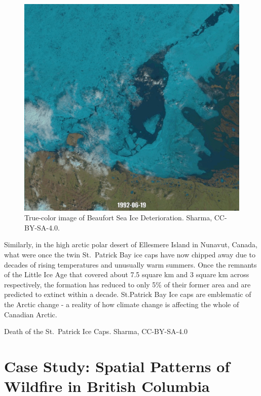 \documentclass[
]{book}
\begin{document}
\begin{figure}
\includegraphics[width=16.57in]{images/13-Beaufort-Sea-Ice-static} \caption{True-color image of Beaufort Sea Ice Deterioration. Sharma, CC-BY-SA-4.0.}\label{fig:14-Beaufort-Sea-Ice}
\end{figure}

Similarly, in the high arctic polar desert of Ellesmere Island in Nunavut, Canada, what were once the twin St.~Patrick Bay ice caps have now chipped away due to decades of rising temperatures and unusually warm summers. Once the remnants of the Little Ice Age that covered about 7.5 square km and 3 square km across respectively, the formation has reduced to only 5\% of their former area and are predicted to extinct within a decade. St.Patrick Bay Ice caps are emblematic of the Arctic change - a reality of how climate change is affecting the whole of Canadian Arctic.

\label{container}

Death of the St.~Patrick Ice Caps. Sharma, CC-BY-SA-4.0

\section{Case Study: Spatial Patterns of Wildfire in British Columbia}\label{case-study-spatial-patterns-of-wildfire-in-british-columbia}
\end{document}
